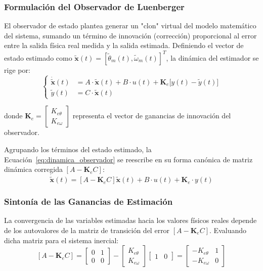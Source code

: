 \documentclass[10pt,a4paper]{article}
\begin{document}
\subsubsection{Formulación del Observador de Luenberger}

El observador de estado plantea generar un "clon" virtual del modelo matemático del sistema, sumando un término de innovación (corrección) proporcional al error entre la salida física real medida y la salida estimada. Definiendo el vector de estado estimado como $\tilde{\mathbf{x}}(t) = [\tilde{\theta}_m(t), \tilde{\omega}_m(t)]^T$, la dinámica del estimador se rige por:
\begin{equation}
    \left\{
    \begin{aligned}
        \dot{\tilde{\mathbf{x}}}(t) &= A \cdot \tilde{\mathbf{x}}(t) + B \cdot u(t) + \mathbf{K}_e \big[ y(t) - \tilde{y}(t) \big] \\
        \tilde{y}(t) &= C \cdot \tilde{\mathbf{x}}(t)
    \end{aligned}
    \right.
    \label{eq:dinamica_observador}
\end{equation}

donde $\mathbf{K}_e = \begin{bmatrix} K_{e\theta} \\ K_{e\omega} \end{bmatrix}$ representa el vector de ganancias de innovación del observador.

Agrupando los términos del estado estimado, la Ecuación~\eqref{eq:dinamica_observador} se reescribe en su forma canónica de matriz dinámica corregida $[A - \mathbf{K}_e C]$:
\begin{equation*}
    \dot{\tilde{\mathbf{x}}}(t) = \left[ A - \mathbf{K}_e C \right] \tilde{\mathbf{x}}(t) + B \cdot u(t) + \mathbf{K}_e \cdot y(t)
\end{equation*}

\subsubsection{Sintonía de las Ganancias de Estimación}

La convergencia de las variables estimadas hacia los valores físicos reales depende de los autovalores de la matriz de transición del error $[A - \mathbf{K}_e C]$. Evaluando dicha matriz para el sistema inercial:
\begin{equation*}
    \left[ A - \mathbf{K}_e C \right] = 
    \begin{bmatrix} 0 & 1 \\ 0 & 0 \end{bmatrix} - 
    \begin{bmatrix} K_{e\theta} \\ K_{e\omega} \end{bmatrix} \begin{bmatrix} 1 & 0 \end{bmatrix} = 
    \begin{bmatrix} -K_{e\theta} & 1 \\ -K_{e\omega} & 0 \end{bmatrix}
\end{equation*}
\end{document}
